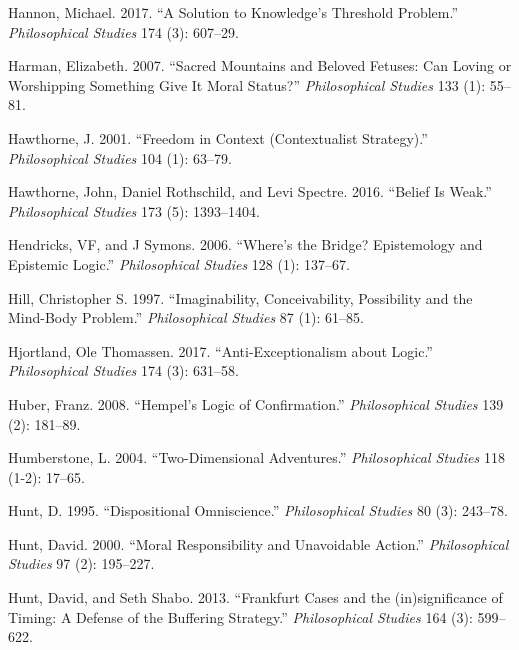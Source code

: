 \documentclass[
  10pt,
  letterpaper,
  DIV=11,
  numbers=noendperiod,
  twoside]{scrartcl}
\newlength{\cslhangindent}
\newenvironment{CSLReferences}[2] %
 {\begin{list}{}{%
  \setlength{\itemindent}{0pt}
  \setlength{\leftmargin}{0pt}
  \setlength{\parsep}{0pt}
  \ifodd #1
   \setlength{\leftmargin}{\cslhangindent}
   \setlength{\itemindent}{-1\cslhangindent}
  \fi
  \setlength{\itemsep}{#2\baselineskip}}}
 {\end{list}}
\begin{document}
\begin{CSLReferences}{1}{0}
Hannon, Michael. 2017. {``A Solution to Knowledge's Threshold
Problem.''} \emph{Philosophical Studies} 174 (3): 607--29.

Harman, Elizabeth. 2007. {``Sacred Mountains and Beloved Fetuses: Can
Loving or Worshipping Something Give It Moral Status?''}
\emph{Philosophical Studies} 133 (1): 55--81.

Hawthorne, J. 2001. {``Freedom in Context (Contextualist Strategy).''}
\emph{Philosophical Studies} 104 (1): 63--79.

Hawthorne, John, Daniel Rothschild, and Levi Spectre. 2016. {``Belief Is
Weak.''} \emph{Philosophical Studies} 173 (5): 1393--1404.

Hendricks, VF, and J Symons. 2006. {``Where's the Bridge? Epistemology
and Epistemic Logic.''} \emph{Philosophical Studies} 128 (1): 137--67.

Hill, Christopher S. 1997. {``Imaginability, Conceivability, Possibility
and the Mind-Body Problem.''} \emph{Philosophical Studies} 87 (1):
61--85.

Hjortland, Ole Thomassen. 2017. {``Anti-Exceptionalism about Logic.''}
\emph{Philosophical Studies} 174 (3): 631--58.

Huber, Franz. 2008. {``Hempel's Logic of Confirmation.''}
\emph{Philosophical Studies} 139 (2): 181--89.

Humberstone, L. 2004. {``Two-Dimensional Adventures.''}
\emph{Philosophical Studies} 118 (1-2): 17--65.

Hunt, D. 1995. {``Dispositional Omniscience.''} \emph{Philosophical
Studies} 80 (3): 243--78.

Hunt, David. 2000. {``Moral Responsibility and Unavoidable Action.''}
\emph{Philosophical Studies} 97 (2): 195--227.

Hunt, David, and Seth Shabo. 2013. {``Frankfurt Cases and the
(in)significance of Timing: A Defense of the Buffering Strategy.''}
\emph{Philosophical Studies} 164 (3): 599--622.


\end{CSLReferences}
\end{document}

